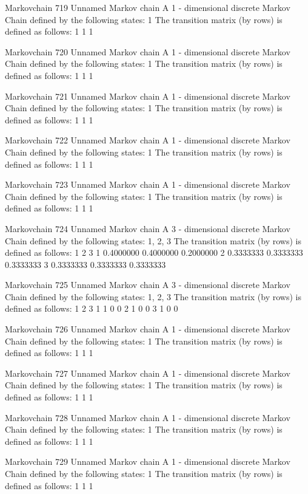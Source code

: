 \documentclass[
  nojss]{jss}
\begin{document}
\begin{CodeChunk}
\begin{CodeOutput}
Markovchain  719 
Unnamed Markov chain 
 A  1 - dimensional discrete Markov Chain defined by the following states: 
 1 
 The transition matrix  (by rows)  is defined as follows: 
  1
1 1

Markovchain  720 
Unnamed Markov chain 
 A  1 - dimensional discrete Markov Chain defined by the following states: 
 1 
 The transition matrix  (by rows)  is defined as follows: 
  1
1 1

Markovchain  721 
Unnamed Markov chain 
 A  1 - dimensional discrete Markov Chain defined by the following states: 
 1 
 The transition matrix  (by rows)  is defined as follows: 
  1
1 1

Markovchain  722 
Unnamed Markov chain 
 A  1 - dimensional discrete Markov Chain defined by the following states: 
 1 
 The transition matrix  (by rows)  is defined as follows: 
  1
1 1

Markovchain  723 
Unnamed Markov chain 
 A  1 - dimensional discrete Markov Chain defined by the following states: 
 1 
 The transition matrix  (by rows)  is defined as follows: 
  1
1 1

Markovchain  724 
Unnamed Markov chain 
 A  3 - dimensional discrete Markov Chain defined by the following states: 
 1, 2, 3 
 The transition matrix  (by rows)  is defined as follows: 
          1         2         3
1 0.4000000 0.4000000 0.2000000
2 0.3333333 0.3333333 0.3333333
3 0.3333333 0.3333333 0.3333333

Markovchain  725 
Unnamed Markov chain 
 A  3 - dimensional discrete Markov Chain defined by the following states: 
 1, 2, 3 
 The transition matrix  (by rows)  is defined as follows: 
  1 2 3
1 1 0 0
2 1 0 0
3 1 0 0

Markovchain  726 
Unnamed Markov chain 
 A  1 - dimensional discrete Markov Chain defined by the following states: 
 1 
 The transition matrix  (by rows)  is defined as follows: 
  1
1 1

Markovchain  727 
Unnamed Markov chain 
 A  1 - dimensional discrete Markov Chain defined by the following states: 
 1 
 The transition matrix  (by rows)  is defined as follows: 
  1
1 1

Markovchain  728 
Unnamed Markov chain 
 A  1 - dimensional discrete Markov Chain defined by the following states: 
 1 
 The transition matrix  (by rows)  is defined as follows: 
  1
1 1

Markovchain  729 
Unnamed Markov chain 
 A  1 - dimensional discrete Markov Chain defined by the following states: 
 1 
 The transition matrix  (by rows)  is defined as follows: 
  1
1 1


\end{CodeOutput}
\end{CodeChunk}
\end{document}
